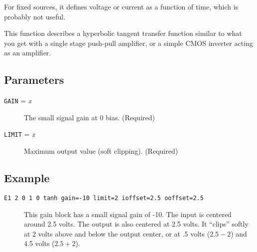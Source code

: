 For fixed sources, it defines voltage or current as a function of
time, which is probably not useful.

This function describes a hyperbolic tangent transfer function similar 
to what you get with a single stage push-pull amplifier, or a simple
CMOS inverter acting as an amplifier.
\subsection{Parameters}

\begin{description}

\item[{\tt GAIN} = {\it x}] The small signal gain at 0 bias.  (Required)

\item[{\tt LIMIT} = {\it x}] Maximum output value (soft clipping).
(Required)

\end{description}
\subsection{Example} 

\begin{description}

\item[{\tt E1 2 0 1 0 tanh gain=-10 limit=2 ioffset=2.5 ooffset=2.5}] 
This gain block has a small signal gain of -10.  The input is
centered around 2.5 volts.  The output is also centered at 2.5 volts.
It ``clips'' softly at 2 volts above and below the output center, or
at .5 volts ($2.5 - 2$) and 4.5 volts ($2.5 + 2$).

\end{description}
